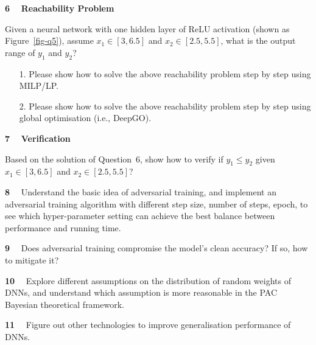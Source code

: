 \begin{newquestion}{\textbf{6}~~}\label{q5}
\textbf{Reachability Problem}

Given a neural network with one hidden layer of ReLU activation (shown as Figure~\ref{fig-q5}), assume $x_1\in [3,6.5]$ and $x_2\in [2.5, 5.5]$, what is the output range of $y_1$ and $y_2$?

\begin{itemize}
    \item[1.] Please show how to solve the above reachability problem step by step using MILP/LP.
    
    \item[2.] Please show how to solve the above reachability problem step by step using global optimisation (i.e., DeepGO).
\end{itemize}
\end{newquestion}


\begin{newquestion}{\textbf{7}~~}
\textbf{Verification}

Based on the solution of Question~6,  show how to verify if $y_1\leq y_2$ given $x_1\in [3,6.5]$ and $x_2\in [2.5, 5.5]$?

\end{newquestion}




\begin{newquestion}{\textbf{8}~~}
Understand the basic idea of adversarial training, and implement an adversarial training algorithm with different step size, number of steps, epoch, to see which hyper-parameter setting can achieve the best balance between performance and running time.  
\end{newquestion}



\begin{newquestion}{\textbf{9}~~}
Does adversarial training compromise the model's  clean accuracy? If so, how to mitigate it?  
\end{newquestion}



\begin{newquestion}{\textbf{10}~~}
Explore different assumptions on the distribution of random weights of DNNs, and understand which assumption is more reasonable in the PAC Bayesian theoretical framework. 
\end{newquestion}



\begin{newquestion}{\textbf{11}~~}
Figure out other technologies to improve generalisation performance of DNNs. 
\end{newquestion}